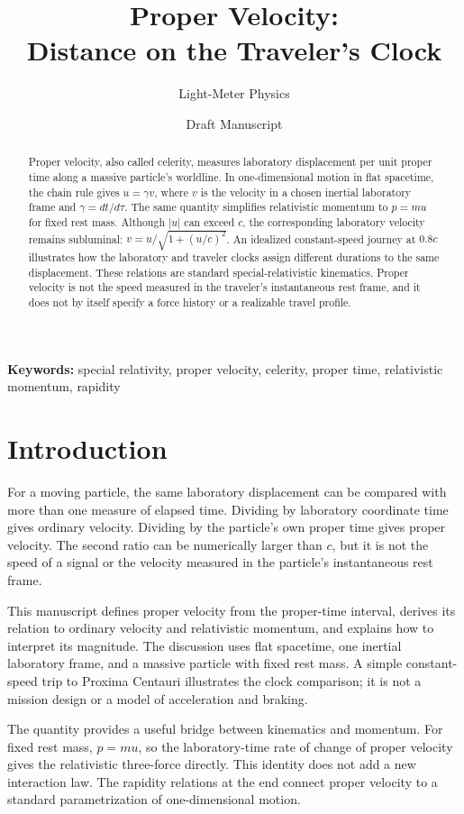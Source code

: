 \documentclass[12pt]{article}
\title{Proper Velocity:\\
Distance on the Traveler's Clock}
\author{Light-Meter Physics}
\date{Draft Manuscript}
\begin{document}
\maketitle

\begin{abstract}
Proper velocity, also called celerity, measures laboratory displacement per unit proper time along a massive particle's worldline. In one-dimensional motion in flat spacetime, the chain rule gives $u=\gamma v$, where $v$ is the velocity in a chosen inertial laboratory frame and $\gamma=dt/d\tau$. The same quantity simplifies relativistic momentum to $p=mu$ for fixed rest mass. Although $|u|$ can exceed $c$, the corresponding laboratory velocity remains subluminal: $v=u/\sqrt{1+(u/c)^2}$. An idealized constant-speed journey at $0.8c$ illustrates how the laboratory and traveler clocks assign different durations to the same displacement. These relations are standard special-relativistic kinematics. Proper velocity is not the speed measured in the traveler's instantaneous rest frame, and it does not by itself specify a force history or a realizable travel profile.
\end{abstract}

\noindent\textbf{Keywords:} special relativity, proper velocity, celerity, proper time, relativistic momentum, rapidity

\section{Introduction}
\label{sec:introduction}

For a moving particle, the same laboratory displacement can be compared with more than one measure of elapsed time. Dividing by laboratory coordinate time gives ordinary velocity. Dividing by the particle's own proper time gives proper velocity. The second ratio can be numerically larger than $c$, but it is not the speed of a signal or the velocity measured in the particle's instantaneous rest frame.

This manuscript defines proper velocity from the proper-time interval, derives its relation to ordinary velocity and relativistic momentum, and explains how to interpret its magnitude. The discussion uses flat spacetime, one inertial laboratory frame, and a massive particle with fixed rest mass. A simple constant-speed trip to Proxima Centauri illustrates the clock comparison; it is not a mission design or a model of acceleration and braking.

The quantity provides a useful bridge between kinematics and momentum. For fixed rest mass, $p=mu$, so the laboratory-time rate of change of proper velocity gives the relativistic three-force directly. This identity does not add a new interaction law. The rapidity relations at the end connect proper velocity to a standard parametrization of one-dimensional motion.
\end{document}
